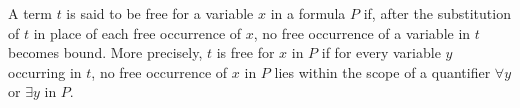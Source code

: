 A term $t$ is said to be free for a variable $x$ in a formula $P$ if, after the substitution of $t$ in place of each free occurrence of $x$, no free occurrence of a variable in $t$ becomes bound. More precisely, $t$ is free for $x$ in $P$ if for every variable $y$ occurring in $t$, no free occurrence of $x$ in $P$ lies within the scope of a quantifier $\forall y$ or $\exists y$ in $P$.
